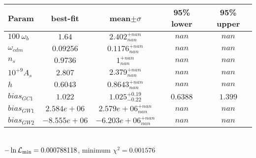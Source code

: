 \begin{tabular}{|l|c|c|c|c|} 
 \hline 
Param & best-fit & mean$\pm\sigma$ & 95\% lower & 95\% upper \\ \hline 
$100~\omega_{b }$ &$1.64$ & $2.402_{nan}^{+nan}$ & $nan$ & $nan$ \\ 
$\omega_{cdm }$ &$0.09256$ & $0.1176_{nan}^{+nan}$ & $nan$ & $nan$ \\ 
$n_{s }$ &$0.9736$ & $1_{nan}^{+nan}$ & $nan$ & $nan$ \\ 
$10^{+9}A_{s }$ &$2.807$ & $2.379_{nan}^{+nan}$ & $nan$ & $nan$ \\ 
$h$ &$0.6043$ & $0.8643_{nan}^{+nan}$ & $nan$ & $nan$ \\ 
$bias_{GC 1 }$ &$1.022$ & $1.025_{-0.22}^{+0.19}$ & $0.6388$ & $1.399$ \\ 
$bias_{GW 1 }$ &$2.584e+06$ & $2.579e+06_{nan}^{+nan}$ & $nan$ & $nan$ \\ 
$bias_{GW 2 }$ &$-8.555e+06$ & $-6.203e+06_{nan}^{+nan}$ & $nan$ & $nan$ \\ 
\hline 
 \end{tabular} \\ 
$-\ln{\cal L}_\mathrm{min} =0.000788118$, minimum $\chi^2=0.001576$ \\ 
